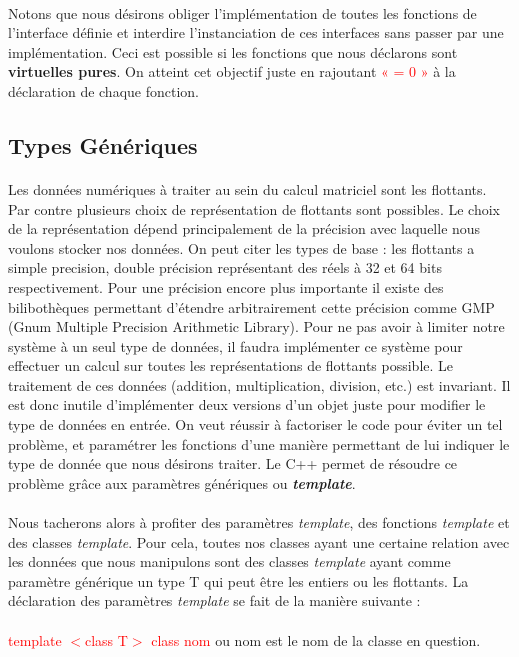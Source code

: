 \documentclass[a4paper, 10pt]{report}
\begin{document}
\paragraph*{}
Notons que nous désirons obliger l’implémentation de toutes les fonctions de l’interface définie et interdire 
l’instanciation de ces interfaces sans passer par une implémentation. Ceci est possible si les fonctions que nous 
déclarons sont \textbf{virtuelles pures}. On atteint cet objectif juste en rajoutant \textcolor{red}{« = 0 »} à la déclaration de chaque fonction.

\subsection{Types Génériques}
\paragraph*{}
Les données numériques à traiter au sein du calcul matriciel sont les flottants. Par contre plusieurs choix de représentation
de flottants sont possibles. Le choix de la représentation dépend principalement de la précision avec laquelle nous voulons
stocker nos données. On peut citer les types de base : les flottants a simple precision, double précision représentant des réels
à 32 et 64 bits respectivement. Pour une précision encore plus importante il existe des bilibothèques permettant d'étendre
arbitrairement cette précision comme GMP (Gnum Multiple Precision Arithmetic Library).
Pour ne pas avoir à limiter notre système à un seul type de données, il faudra implémenter ce système pour effectuer un 
calcul sur toutes les représentations de flottants possible. Le traitement de ces données (addition, multiplication, division, etc.) est invariant. 
Il est donc inutile d’implémenter deux versions d’un objet juste pour modifier le type de données en entrée. On veut réussir 
à factoriser le code pour éviter un tel problème, et paramétrer les fonctions d’une manière permettant de lui indiquer le 
type de donnée que nous désirons traiter. Le C++ permet de résoudre ce problème grâce aux paramètres génériques
 ou \textbf{\textit{template}}.
\paragraph*{}
Nous tacherons alors à profiter des paramètres \textit{template}, des fonctions \textit{template} et des classes 
\textit{template}. Pour cela, toutes nos classes ayant une certaine relation avec les données que nous manipulons 
sont des classes \textit{template} ayant comme paramètre générique un type T qui peut être les entiers ou les flottants.\newline
La déclaration des paramètres \textit{template} se fait de la manière suivante :\paragraph*{}
\textcolor{red}{template $<$class T$>$ class nom} ou nom est le nom de la classe en question.
\end{document}
